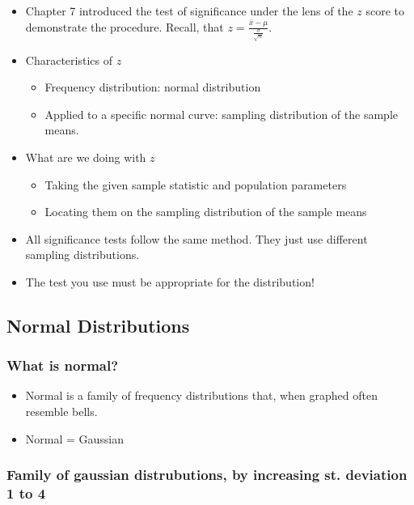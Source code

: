 \documentclass[]{article}
\begin{document}
\begin{itemize}
\itemsep1pt\parskip0pt
\item
  Chapter 7 introduced the test of significance under the lens of the
  $z$ score to demonstrate the procedure. Recall, that
  $z = \frac{\bar{x} - \mu}{\frac{\sigma}{\sqrt{n}}}$.
\item
  Characteristics of $z$

  \begin{itemize}
  \itemsep1pt\parskip0pt
  \item
    Frequency distribution: normal distribution
  \item
    Applied to a specific normal curve: sampling distribution of the
    sample means.
  \end{itemize}
\item
  What are we doing with $z$

  \begin{itemize}
  \itemsep1pt\parskip0pt
  \item
    Taking the given sample statistic and population parameters
  \item
    Locating them on the sampling distribution of the sample means
  \end{itemize}
\item
  All significance tests follow the same method. They just use different
  sampling distributions.
\item
  The test you use must be appropriate for the distribution!
\end{itemize}

\subsection{Normal Distributions}\label{normal-distributions}

\subsubsection{What is normal?}\label{what-is-normal}

\begin{itemize}
\itemsep1pt\parskip0pt
\item
  Normal is a family of frequency distributions that, when graphed often
  resemble bells.
\item
  Normal = Gaussian
\end{itemize}

\subsubsection{Family of gaussian distrubutions, by increasing st.
deviation 1 to
4}\label{family-of-gaussian-distrubutions-by-increasing-st.-deviation-1-to-4}
\end{document}
